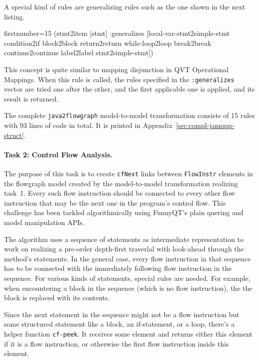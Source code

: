 \documentclass[submission]{eptcs}
\begin{document}
A special kind of rules are generalizing rules such as the one shown in the
next listing.

\begin{clojurecode*}{firstnumber=15}
  (stmt2item [stmt]
      :generalizes [local-var-stmt2simple-stmt condition2if block2block
                    return2return while-loop2loop break2break continue2continue
                    label2label stmt2simple-stmt])
\end{clojurecode*}

This concept is quite similar to mapping disjunction in QVT Operational
Mappings.  When this rule is called, the rules specified in the
\verb|:generalizes| vector are tried one after the other, and the first
applicable one is applied, and its result is returned.

The complete \verb|java2flowgraph| model-to-model transformation consists of 15
rules with 93 lines of code in total.  It is printed in
Appendix~\ref{sec:compl-jamopp-struct}.


\paragraph{Task 2: Control Flow Analysis.}
\label{sec:task-2}

The purpose of this task is to create \verb|cfNext| links between
\verb|FlowInstr| elements in the flowgraph model created by the model-to-model
transformation realizing task~1.  Every such flow instruction should be
connected to every other flow instruction that may be the next one in the
program's control flow.  This challenge has been tackled algorithmically using
FunnyQT's plain quering and model manipulation APIs.

The algorithm uses a sequence of statements as intermediate representation to
work on realizing a pre-order depth-first traverlal with look-ahead through the
method's statements.  In the general case, every flow instruction in that
sequence has to be connected with the immediately following flow instruction in
the sequence.  For various kinds of statements, special rules are needed.  For
example, when encountering a block in the sequence (which is no flow
instruction), the the block is replaced with its contents.

Since the next statement in the sequence might not be a flow instruction but
some structured statement like a block, an if-statement, or a loop, there's a
helper function \verb|cf-peek|.  It receives some element and returns either
this element if it is a flow instruction, or otherwise the first flow
instruction inside this element.
\end{document}
